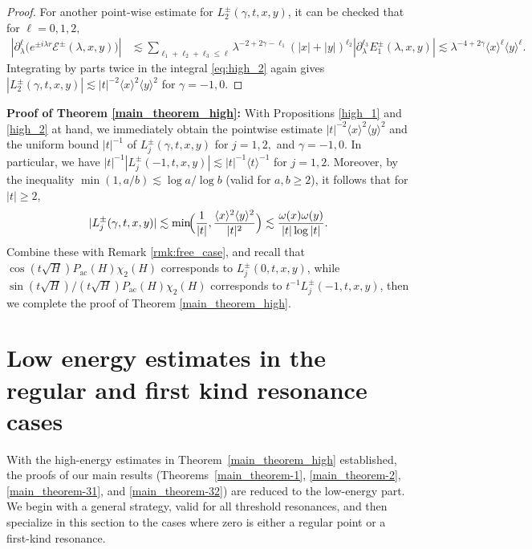 \documentclass[reqno]{amsart}
\numberwithin{equation}{section}
\begin{document}
\begin{proof}
 For another point-wise estimate for $L_{2}^{\pm}(\gamma,t,x,y)$,
it can be checked that for $\ell=0,1,2,$
$$
\begin{aligned}
\left|\partial_\lambda^{\ell}\bigl( e^{\pm i\lambda r} \mathcal{E}^\pm(\lambda, x, y) \bigr)\right|
 & \lesssim \sum_{\ell_1+\ell_2+\ell_3 \leq \ell}\lambda^{-2+2\gamma-\ell_1}(|x|+|y|)^{\ell_2} \left|\partial_\lambda^{\ell_3} E_{1}^{\pm}(\lambda,x,y)\right|\lesssim \lambda^{-4+2\gamma}\langle x \rangle^{\ell} \langle y \rangle^{\ell}.
\end{aligned}
$$
Integrating by parts twice in the integral \eqref{eq:high_2}  again gives $\left|L_{2}^{\pm}(\gamma,t,x,y)\right| \lesssim |t|^{-2} \langle x \rangle^2 \langle y \rangle^2$ for $\gamma=-1, 0$.
\end{proof}


\noindent\textbf{Proof of Theorem \ref{main_theorem_high}:} With Propositions \ref{high_1} and \ref{high_2} at hand, we
immediately obtain the pointwise estimate $|t|^{-2} \langle x \rangle^2 \langle y \rangle^2
$
and the uniform  bound $|t|^{-1}$ of $L_j^{\pm}(\gamma,t,x,y)$ for $j=1,2,$ and $\gamma=-1,0.$  In particular, we have
$ |t|^{-1}|L_j^{\pm}(-1,t,x,y)|\lesssim |t|^{-1}\langle t\rangle^{-1}$  for  $j=1,2.$ 
Moreover, by the inequality  $\min(1,a/b) \lesssim \log a/\log b$ (valid for $a,b\ge 2$),
it follows that for $|t|\ge 2$,
\[|L_j^{\pm}(\gamma,t,x,y)|\lesssim
\min\!\Bigl(\frac1{|t|},\frac{\langle x\rangle^{2}\langle y\rangle^{2}}{|t|^{2}}\Bigr)
\lesssim\frac{\omega(x)\omega(y)}{|t|\log|t|}.
\]
Combine these with Remark \ref{rmk:free_case}, and recall that \(\cos(t\sqrt{H})P_{\mathrm{ac}}(H)\chi_2(H)\) corresponds to \(L_{j}^{\pm}(0,t,x,y)\), while ${\sin(t\sqrt{H})}/({t\sqrt{H}})P_{\mathrm{ac}}(H)\chi_2(H)$  corresponds to \( t^{-1} L_{j}^{\pm}(-1,t,x,y)\), then we complete the proof of Theorem \ref{main_theorem_high}.


\section{Low energy estimates in the regular and first kind resonance cases}\label{sec:regular_first}
With  the high-energy estimates in Theorem~\ref{main_theorem_high} established, the proofs of our main results (Theorems~\ref{main_theorem-1}, \ref{main_theorem-2}, \ref{main_theorem-31}, and \ref{main_theorem-32}) are reduced to the low-energy part. 
We begin with a
general strategy, valid for all threshold resonances, and then
specialize in this section to the cases where zero is either a
regular point or a first-kind resonance.
\end{document}
